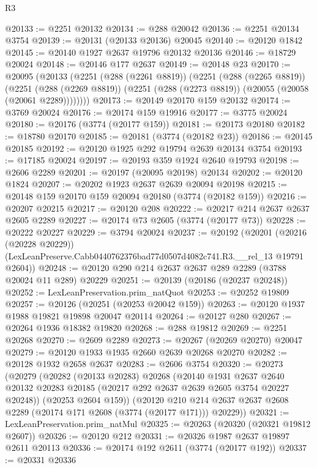 \begin{lexlean}{R3}
\begin{coremodule}
@20133 := @2251 @20132
@20134 := @288 @20042
@20136 := @2251 @20134 @3754
@20139 := @20131 (@20133 @20136) @20045
@20140 := @20120 @1842
@20145 := @20140 @1927 @2637 @19796 @20132 @20136
@20146 := @18729 @20024
@20148 := @20146 @177 @2637
@20149 := @20148 @23
@20170 := @20095
    (@20133
      (@2251
        (@288 (@2261 @8819))
        (@2251
          (@288 (@2265 @8819))
          (@2251
            (@288 (@2269 @8819))
            (@2251 (@288 (@2273 @8819)) (@20055 (@20058 (@20061 @2289))))))))
@20173 := @20149 @20170 @159 @20132
@20174 := @3769 @20024
@20176 := @20174 @159 @19916
@20177 := @3775 @20024
@20180 := @20176 (@3774 (@20177 @159))
@20181 := @20173 @20180
@20182 := @18780 @20170
@20185 := @20181 (@3774 (@20182 @23))
@20186 := @20145 @20185
@20192 := @20120 @1925 @292 @19794 @2639 @20134 @3754
@20193 := @17185 @20024
@20197 := @20193 @359 @1924 @2640 @19793
@20198 := @2606 @2289
@20201 := @20197 (@20095 @20198) @20134
@20202 := @20120 @1824
@20207 := @20202 @1923 @2637 @2639 @20094 @20198
@20215 := @20148 @159 @20170 @159 @20094 @20180 (@3774 (@20182 @159))
@20216 := @20207 @20215
@20217 := @20120 @208
@20222 := @20217 @214 @2637 @2637 @2605 @2289
@20227 := @20174 @73 @2605 (@3774 (@20177 @73))
@20228 := @20222 @20227
@20229 := @3794 @20024
@20237 := @20192
    (@20201
      (@20216 (@20228 @20229))
      (LexLeanPreserve.Cabb0440762376bad77d0507d4082c741.R3.__rel_13 @19791 @2604))
@20248 := @20120 @290 @214 @2637 @2637 @289 @2289 (@3788 @20024 @11 @289) @20229
@20251 := @20139 (@20186 (@20237 @20248))
@20252 := LexLeanPreservation.prim_natQuot
@20253 := @20252 @19809
@20257 := @20126 (@20251 (@20253 @20042 @159))
@20263 := @20120 @1937 @1988 @19821 @19898 @20047 @20114
@20264 := @20127 @280
@20267 := @20264 @1936 @18382 @19820
@20268 := @288 @19812
@20269 := @2251 @20268
@20270 := @2609 @2289
@20273 := @20267 (@20269 @20270) @20047
@20279 := @20120 @1933 @1935 @2660 @2639 @20268 @20270
@20282 := @20128 @1932 @2658 @2637
@20283 := @2606 @3754
@20320 := @20273
    (@20279
      (@20282
        (@20133 @20283)
        @20268
        (@20140
          @1931
          @2637
          @2640
          @20132
          @20283
          @20185
          (@20217 @292 @2637 @2639 @2605 @3754 @20227 @20248))
        (@20253 @2604 @159))
      (@20120 @210 @214 @2637 @2637 @2608 @2289 (@20174 @171 @2608 (@3774 (@20177 @171))) @20229))
@20321 := LexLeanPreservation.prim_natMul
@20325 := @20263 (@20320 (@20321 @19812 @2607))
@20326 := @20120 @212
@20331 := @20326 @1987 @2637 @19897 @2611 @20113
@20336 := @20174 @192 @2611 (@3774 (@20177 @192))
@20337 := @20331 @20336

\end{coremodule}
\end{lexlean}
